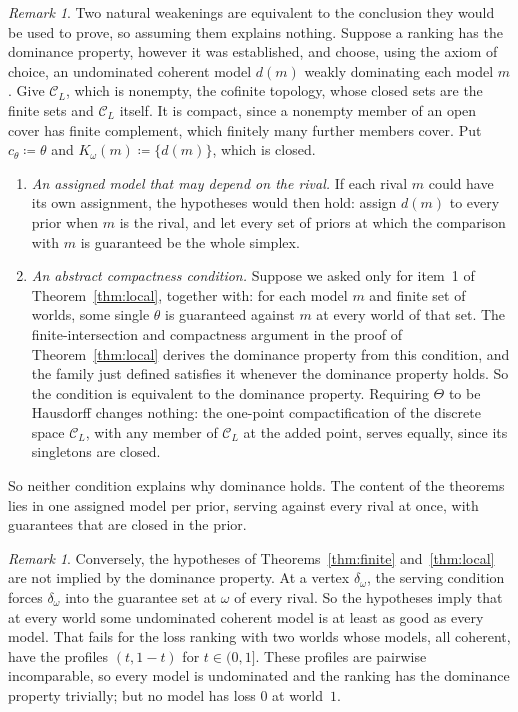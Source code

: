 \documentclass[11pt]{article}
\theoremstyle{definition}
\theoremstyle{remark}
\newtheorem{remark}[theorem]{Remark}
\newcommand{\C}{\mathcal C}
\begin{document}
\begin{remark}\label{rem:collapse}
Two natural weakenings are equivalent to the conclusion they would be used to prove, so assuming them explains nothing. Suppose a ranking has the dominance property, however it was established, and choose, using the axiom of choice, an undominated coherent model $d(m)$ weakly dominating each model $m$. Give $\C_L$, which is nonempty, the cofinite topology, whose closed sets are the finite sets and $\C_L$ itself. It is compact, since a nonempty member of an open cover has finite complement, which finitely many further members cover. Put $c_\theta\coloneqq\theta$ and $K_\omega(m)\coloneqq\{d(m)\}$, which is closed.
\begin{enumerate}[label=(\roman*)]
\item \emph{An assigned model that may depend on the rival.} If each rival $m$ could have its own assignment, the hypotheses would then hold: assign $d(m)$ to every prior when $m$ is the rival, and let every set of priors at which the comparison with $m$ is guaranteed be the whole simplex.
\item \emph{An abstract compactness condition.} Suppose we asked only for item~1 of Theorem~\ref{thm:local}, together with: for each model $m$ and finite set of worlds, some single $\theta$ is guaranteed against $m$ at every world of that set. The finite-intersection and compactness argument in the proof of Theorem~\ref{thm:local} derives the dominance property from this condition, and the family just defined satisfies it whenever the dominance property holds. So the condition is equivalent to the dominance property. Requiring $\Theta$ to be Hausdorff changes nothing: the one-point compactification of the discrete space $\C_L$, with any member of $\C_L$ at the added point, serves equally, since its singletons are closed.
\end{enumerate}
So neither condition explains why dominance holds. The content of the theorems lies in one assigned model per prior, serving against every rival at once, with guarantees that are closed in the prior.
\end{remark}

\begin{remark}\label{rem:vertex}
Conversely, the hypotheses of Theorems~\ref{thm:finite} and~\ref{thm:local} are not implied by the dominance property. At a vertex $\delta_\omega$, the serving condition forces $\delta_\omega$ into the guarantee set at $\omega$ of every rival. So the hypotheses imply that at every world some undominated coherent model is at least as good as every model. That fails for the loss ranking with two worlds whose models, all coherent, have the profiles $(t,1-t)$ for $t\in(0,1]$. These profiles are pairwise incomparable, so every model is undominated and the ranking has the dominance property trivially; but no model has loss $0$ at world~$1$.
\end{remark}
\end{document}
